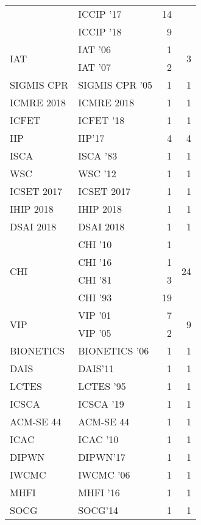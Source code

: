 \begin{table*}[t]
\begin{tabular}{llrr}
& ICCIP '17 & 14 &\\
& ICCIP '18 & 9 &\\
\multirow{2}{*}{IAT } & IAT '06 & 1 & \multirow{2}{*}{3}\\
& IAT '07 & 2 &\\
\multirow{1}{*}{SIGMIS CPR } & SIGMIS CPR '05 & 1 & \multirow{1}{*}{1}\\
\multirow{1}{*}{ICMRE 2018} & ICMRE 2018 & 1 & \multirow{1}{*}{1}\\
\multirow{1}{*}{ICFET } & ICFET '18 & 1 & \multirow{1}{*}{1}\\
\multirow{1}{*}{IIP} & IIP'17 & 4 & \multirow{1}{*}{4}\\
\multirow{1}{*}{ISCA } & ISCA '83 & 1 & \multirow{1}{*}{1}\\
\multirow{1}{*}{WSC } & WSC '12 & 1 & \multirow{1}{*}{1}\\
\multirow{1}{*}{ICSET 2017} & ICSET 2017 & 1 & \multirow{1}{*}{1}\\
\multirow{1}{*}{IHIP 2018} & IHIP 2018 & 1 & \multirow{1}{*}{1}\\
\multirow{1}{*}{DSAI 2018} & DSAI 2018 & 1 & \multirow{1}{*}{1}\\
\multirow{4}{*}{CHI } & CHI '10 & 1 & \multirow{4}{*}{24}\\
& CHI '16 & 1 &\\
& CHI '81 & 3 &\\
& CHI '93 & 19 &\\
\multirow{2}{*}{VIP } & VIP '01 & 7 & \multirow{2}{*}{9}\\
& VIP '05 & 2 &\\
\multirow{1}{*}{BIONETICS } & BIONETICS '06 & 1 & \multirow{1}{*}{1}\\
\multirow{1}{*}{DAIS} & DAIS'11 & 1 & \multirow{1}{*}{1}\\
\multirow{1}{*}{LCTES } & LCTES '95 & 1 & \multirow{1}{*}{1}\\
\multirow{1}{*}{ICSCA } & ICSCA '19 & 1 & \multirow{1}{*}{1}\\
\multirow{1}{*}{ACM-SE 44} & ACM-SE 44 & 1 & \multirow{1}{*}{1}\\
\multirow{1}{*}{ICAC } & ICAC '10 & 1 & \multirow{1}{*}{1}\\
\multirow{1}{*}{DIPWN} & DIPWN'17 & 1 & \multirow{1}{*}{1}\\
\multirow{1}{*}{IWCMC } & IWCMC '06 & 1 & \multirow{1}{*}{1}\\
\multirow{1}{*}{MHFI } & MHFI '16 & 1 & \multirow{1}{*}{1}\\
\multirow{1}{*}{SOCG} & SOCG'14 & 1 & \multirow{1}{*}{1}\\

\end{tabular}
\end{table*}

